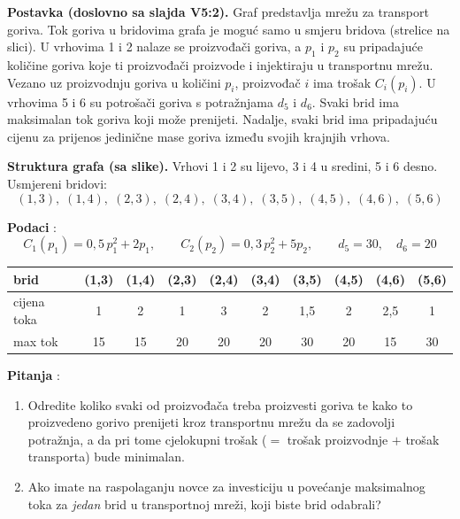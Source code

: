 \begin{zadatak}

\textbf{Postavka (doslovno sa slajda V5:2).} Graf predstavlja mrežu za transport
goriva. Tok goriva u bridovima grafa je moguć samo u smjeru bridova (strelice
na slici). U vrhovima 1 i 2 nalaze se proizvođači goriva, a $p_1$ i $p_2$ su
pripadajuće količine goriva koje ti proizvođači proizvode i injektiraju u
transportnu mrežu. Vezano uz proizvodnju goriva u količini $p_i$, proizvođač $i$
ima trošak $C_i(p_i)$. U vrhovima 5 i 6 su potrošači goriva s potražnjama $d_5$
i $d_6$. Svaki brid ima maksimalan tok goriva koji može prenijeti. Nadalje,
svaki brid ima pripadajuću cijenu za prijenos jedinične mase goriva između
svojih krajnjih vrhova.

\textbf{Struktura grafa (sa slike).} Vrhovi 1 i 2 su lijevo, 3 i 4 u sredini,
5 i 6 desno. Usmjereni bridovi:
\[
(1,3),\; (1,4),\; (2,3),\; (2,4),\; (3,4),\; (3,5),\; (4,5),\; (4,6),\; (5,6)
\]

\textbf{Podaci} :
\[
C_1(p_1) = 0{,}5\,p_1^2 + 2p_1, \qquad
C_2(p_2) = 0{,}3\,p_2^2 + 5p_2, \qquad
d_5 = 30, \quad d_6 = 20
\]

\begin{center}
\small
\begin{tabular}{lccccccccc}
\toprule
\textbf{brid} & (1,3) & (1,4) & (2,3) & (2,4) & (3,4) & (3,5) & (4,5) & (4,6) & (5,6) \\
\midrule
cijena toka & 1 & 2 & 1 & 3 & 2 & 1{,}5 & 2 & 2{,}5 & 1 \\
max tok & 15 & 15 & 20 & 20 & 20 & 30 & 20 & 15 & 30 \\
\bottomrule
\end{tabular}
\end{center}

\textbf{Pitanja} :

\begin{enumerate}[label=\alph*)]
  \item Odredite koliko svaki od proizvođača treba proizvesti goriva te kako to
        proizvedeno gorivo prenijeti kroz transportnu mrežu da se zadovolji
        potražnja, a da pri tome cjelokupni trošak ($=$ trošak proizvodnje $+$
        trošak transporta) bude minimalan.
  \item Ako imate na raspolaganju novce za investiciju u povećanje maksimalnog
        toka za \emph{jedan} brid u transportnoj mreži, koji biste brid
        odabrali?
\end{enumerate}


\end{zadatak}
